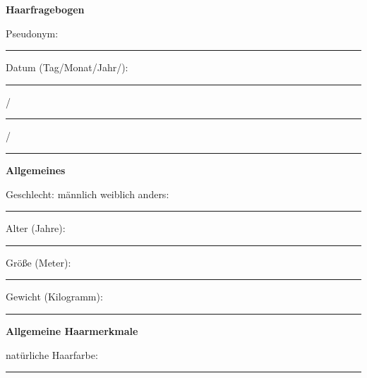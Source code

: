 \begin{center}
{\Large \textbf{Haarfragebogen}}
\end{center}
\vspace*{1cm}

\newcommand{\urule}[1]{\rule{#1}{0.15mm}}
\newcommand{\hfsection}[1]{\vspace*{5mm}\noindent\large \textbf{#1}}
\newcommand{\abox}[1]{\framebox[5mm][l]{\phantom{X}} #1}

\newcommand{\hfitemone}[1]{
  \begin{tabular}{@{}p{0.15\textwidth}lp{0.65\textwidth}}
    #1 & \abox{nein} \abox{ja} $\Rightarrow$ & Wann (letzte): \\
    && Produkt: \\
  \end{tabular}
}
\newcommand{\hfitemtwo}[1]{
  \begin{tabular}{@{}p{0.15\textwidth}lp{0.65\textwidth}}
    #1 & \abox{nein} \abox{ja} $\Rightarrow$ & Wann (letzte): \\
  \end{tabular}
}
\newcommand{\hfitemthree}[3]{
  \begin{tabular}{@{}p{0.15\textwidth}lp{0.65\textwidth}}
    #1 & \abox{nein} \abox{ja} $\Rightarrow$ & #2 \\
    && #3 \\
  \end{tabular}
}
\newcommand{\hfitemfour}[1]{
  \begin{tabular}{@{}p{0.3\textwidth}lll}
    #1 & \abox{nein} \abox{ja} $\Rightarrow$ & \urule{1cm} x/Woche & Produkt: \\
    & & & \\
  \end{tabular}
} 


Pseudonym:\urule{4cm} \hspace{\fill}
Datum (Tag/Monat/Jahr/): \urule{0.5cm}/\urule{0.5cm}/\urule{1cm}

\hfsection{Allgemeines}

   Geschlecht: \abox{männlich} \abox{weiblich} \abox{anders:}\urule{3cm}\smallskip
   
   Alter (Jahre): \urule{3cm}\smallskip

   Größe (Meter): \urule{3cm}\smallskip

   Gewicht (Kilogramm): \urule{3cm}\smallskip

\hfsection{Allgemeine Haarmerkmale}

   natürliche Haarfarbe: \urule{3cm}\smallskip

